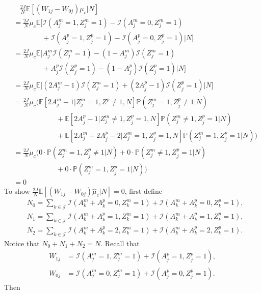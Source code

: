 \documentclass[12pt]{extarticle}
\newcommand{\pp}{\mathbb{P}}
\newcommand{\E}{\mathbb{E}}
\newcommand{\nind}{J}
\newcommand{\indicator}{\mathcal{I}}
\newcommand{\cJ}{\mathcal{J}}
\begin{document}
{\allowdisplaybreaks 
\begin{align} 
\label{eq:e_dtmtpc_dtmtnc}
& ~~~~ \frac{2\nind}{N}\E[(W_{1j}-W_{0j})\mu_c|N] \nonumber \\
& = \frac{2\nind}{N}\mu_c \E\Big[\indicator(A^m_j=1,Z^m_j=1)-\indicator(A^m_j=0,Z^m_j=1) \nonumber \\
& \qquad \qquad + \indicator(A^p_j=1,Z^p_j=1)-\indicator(A^p_j=0,Z^p_j=1) \Big| N\Big] \nonumber \\
& = \frac{2\nind}{N}\mu_c \E\Big[A^m_j\indicator(Z^m_j=1)-(1-A^m_j)\indicator(Z^m_j=1) \nonumber \\
& \qquad \qquad + A^p_j\indicator(Z^p_j=1)-(1-A^p_j)\indicator(Z^p_j=1) \Big| N\Big] \nonumber \\
& = \frac{2\nind}{N}\mu_c \E\Big[(2A^m_j-1)\indicator(Z^m_j=1) + (2A^p_j-1)\indicator(Z^p_j=1)\Big|N\Big] \nonumber \\
& = \frac{2\nind}{N}\mu_c \Big(\E[2A^m_j-1|Z^m_j=1, Z^p\neq 1,N]\pp(Z^m_j=1,Z^p_j\neq 1|N) ~ \nonumber \\
& \qquad \qquad \qquad + \E[2A^p_j-1|Z^m_j\neq 1, Z^p_j=1,N]\pp(Z^m_j\neq 1, Z^p_j=1|N) ~ \nonumber \\
& \qquad \qquad \qquad + \E[2A^m_j+2A^p_j-2|Z^m_j=1,Z^p_j=1,N]\pp(Z^m_j=1,Z^p_j=1|N)\Big) \nonumber \\
& =  \frac{2\nind}{N}\mu_c\Big(0\cdot \pp(Z^m_j=1,Z^p_j\neq 1|N) + 0\cdot \pp(Z^m_j\neq 1, Z^p_j=1|N) ~ \nonumber \\
& \qquad \qquad \qquad + 0 \cdot \pp(Z^m_j=1,Z^p_j=1|N)\Big) \nonumber \\
& = 0 \tag{A5.a}
\end{align} 
To show $\frac{2\nind}{N}\E[(W_{1j}-W_{0j})\hat{\mu}_c|N] = 0$, first define 
\begin{align*}& N_0 = \sum_{k\in \cJ}\indicator(A^m_k+A^p_k=0,Z^m_k=1) + \indicator(A^m_k+A^p_k=0,Z^p_k=1), \\
& N_1 = \sum_{k\in \cJ}\indicator(A^m_k+A^p_k=1,Z^m_k=1) + \indicator(A^m_k+A^p_k=1,Z^p_k=1), \\
& N_2 = \sum_{k\in \cJ}\indicator(A^m_k+A^p_k=2,Z^m_k=1) + \indicator(A^m_k+A^p_k=2,Z^p_k=1).
\end{align*} Notice that $N_0+N_1+N_2=N$. Recall that 
\begin{align*}W_{1j} & = \indicator(A^m_j=1,Z^m_j=1) + \indicator(A^p_j=1,Z^p_j=1), \\
W_{0j} & = \indicator(A^m_j=0,Z^m_j=1) + \indicator(A^p_j=0,Z^p_j=1).
\end{align*} Then 
{\allowdisplaybreaks 
}}
\end{document}
